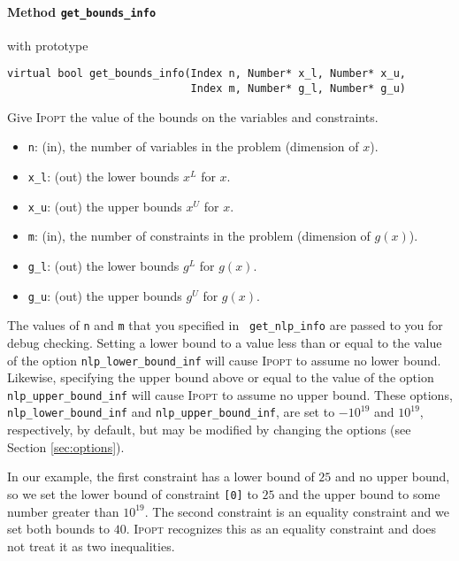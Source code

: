 \documentclass[10pt]{article}
\newcommand{\Ipopt}{\textsc{Ipopt}\xspace}
\begin{document}
\paragraph{Method {\texttt{get\_bounds\_info}}} with prototype
\begin{verbatim}
virtual bool get_bounds_info(Index n, Number* x_l, Number* x_u,
                             Index m, Number* g_l, Number* g_u)
\end{verbatim}
Give \Ipopt the value of the bounds on the variables and constraints.
\begin{itemize}
\item {\tt n}: (in), the number of variables in the problem (dimension of $x$). 
\item {\tt x\_l}: (out) the lower bounds $x^L$ for $x$. 
\item {\tt x\_u}: (out) the upper bounds $x^U$ for $x$.
\item {\tt m}: (in), the number of constraints in the problem (dimension of $g(x)$).
\item {\tt g\_l}: (out) the lower bounds $g^L$ for $g(x)$. 
\item {\tt g\_u}: (out) the upper bounds $g^U$ for $g(x)$.
\end{itemize}
The values of {\tt n} and {\tt m} that you specified in {\tt
  get\_nlp\_info} are passed to you for debug checking.  Setting a
lower bound to a value less than or equal to the value of the option
{\tt nlp\_lower\_bound\_inf} will cause \Ipopt to assume no lower
bound. Likewise, specifying the upper bound above or equal to the
value of the option {\tt nlp\_upper\_bound\_inf} will cause \Ipopt to
assume no upper bound.  These options, {\tt nlp\_lower\_bound\_inf}
and {\tt nlp\_upper\_bound\_inf}, are set to $-10^{19}$ and $10^{19}$,
respectively, by default, but may be modified by changing the options
(see Section \ref{sec:options}).

In our example, the first constraint has a lower bound of $25$ and no upper
bound, so we set the lower bound of constraint {\tt [0]} to $25$ and
the upper bound to some number greater than $10^{19}$. The second
constraint is an equality constraint and we set both bounds to
$40$. \Ipopt recognizes this as an equality constraint and does not
treat it as two inequalities.
\end{document}
